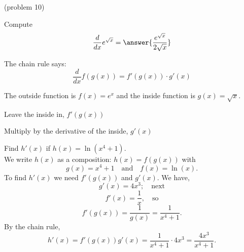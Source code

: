 \documentclass[handout]{ximera}
\begin{document}
\begin{center}
\begin{foldable}
\end{foldable}
\end{center}
 

\begin{problem}(problem 10)

Compute
  \[
  \frac{d}{dx} e^{\sqrt x} = \answer{\frac{e^{\sqrt x}}{2\sqrt x}}
  \]
  
    \begin{hint}
      The chain rule says:
      \[
      \frac{d}{dx} f(g(x)) = f'(g(x))\cdot g'(x)
      \]
    \end{hint}
    \begin{hint}
      The outside function is $f(x) = e^x$ and the inside
      function is $g(x) = \sqrt x$.
    \end{hint}
    \begin{hint}
		  Leave the inside in, $f'(g(x))$
		\end{hint}
		\begin{hint}
		  Multiply by the derivative of the inside, $g'(x)$
		\end{hint}
		
\end{problem}



\begin{example}[example 11]
Find $h'(x)$ if $h(x) = \ln(x^4 +1)$.\\
We write $h(x)$ as a composition: $h(x)=f(g(x))$ with 
\[g(x) = x^4 + 1  \quad \text{and} \quad  f(x) = \ln(x).\]
 To find $h'(x)$ we need $f'(g(x))$ and $g'(x)$.  We have, 
\[g'(x) = 4x^3; \quad \text{next} \] 
\[f'(x) = \frac{1}{x}, \quad \text{so}\]
\[ f'(g(x)) =\frac{1}{g(x)} = \frac{1}{x^4 + 1} .\]
By the chain rule,
\[h'(x) = f'(g(x))g'(x) = \frac{1}{x^4 + 1} \cdot 4x^3 = \frac{4x^3}{x^4 + 1}.\]
\end{example}

\begin{center}
\begin{foldable}
\end{foldable}
\end{center}
 
\end{document}
